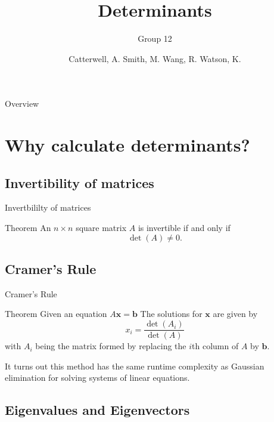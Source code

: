 \documentclass[handout]{beamer}
\title{Determinants}
\subtitle{Group 12}
\author{Catterwell, A. \quad Smith, M. \quad Wang, R. \quad Watson, K.}
\institute{University of Edinburgh}
\begin{document}
\begin{frame}
    \maketitle
\end{frame}

\begin{frame}{Overview}
    \tableofcontents
\end{frame}

\section{Why calculate determinants?}

\subsection{Invertibility of matrices}
\begin{frame}{Invertbililty of matrices}

    \begin{block}{Theorem}
        An $n \times n$ square matrix $A$ is invertible if and only if
        \[
            \det(A) \neq 0.
        \]
    \end{block}

\end{frame}

\subsection{Cramer's Rule}

\begin{frame}{Cramer's Rule}

    \begin{block}{Theorem}
        Given an equation $A\mathbf{x} = \mathbf{b}$
        The solutions for $\mathbf{x}$ are given by
        \[
            x_i = \frac{\det(A_i)}{\det(A)}
        \]
        with $A_i$ being the matrix formed by replacing the $i$th column
        of $A$ by $\mathbf{b}$.
    \end{block}

    \pause{}

    It turns out this method has the same runtime complexity as Gaussian elimination for solving
    systems of linear equations.

\end{frame}

\subsection{Eigenvalues and Eigenvectors}
\end{document}
